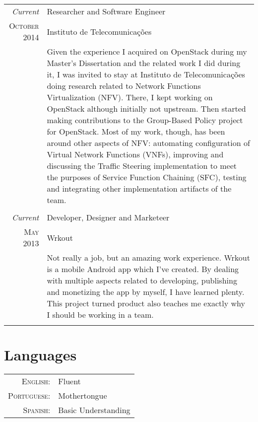 \documentclass[letter,10pt]{article} %
\begin{document}
\begin{tabular}{r|p{11cm}}
	\emph{Current} & Researcher and Software Engineer \\
    \textsc{October 2014} & Instituto de Telecomunicações \\
    & \footnotesize{Given the experience I acquired on OpenStack during my Master's Dissertation and the related work I did during it, I was invited to stay at Instituto de Telecomunicações doing research related to Network Functions Virtualization (NFV). There, I kept working on OpenStack although initially not upstream. Then started making contributions to the Group-Based Policy project for OpenStack. Most of my work, though, has been around other aspects of NFV: automating configuration of Virtual Network Functions (VNFs), improving and discussing the Traffic Steering implementation to meet the purposes of Service Function Chaining (SFC), testing and integrating other implementation artifacts of the team. }\\
	\multicolumn{2}{c}{} \\
	
	\emph{Current} & Developer, Designer and Marketeer \\
	\textsc{May 2013} & Wrkout \\ 
	& \footnotesize{Not really a job, but an amazing work experience. Wrkout is a mobile Android app which I've created. By dealing with multiple aspects related to developing, publishing and monetizing the app by myself, I have learned plenty. This project turned product also teaches me exactly why I should be working in a team.}\\
	\multicolumn{2}{c}{}\\
\end{tabular}


\section{Languages}

\begin{tabular}{rl}
	\textsc{English:} & Fluent\\
	
	\textsc{Portuguese:} & Mothertongue\\
	
	\textsc{Spanish:} & Basic Understanding\\
\end{tabular} \\
\end{document}
